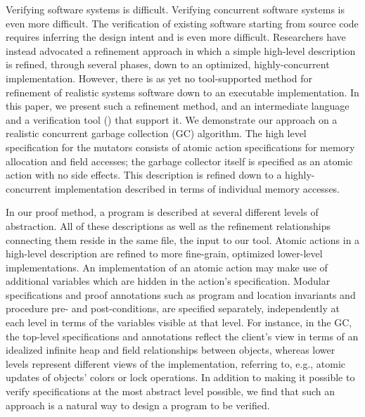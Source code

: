 Verifying software systems is difficult.
Verifying concurrent software systems is even more difficult.
The verification of existing software starting from source code requires inferring the design intent and is even more difficult. 
Researchers have instead advocated a refinement approach in which a simple high-level description is refined, 
through several phases, down to an optimized, highly-concurrent implementation.
However, there is as yet no tool-supported method for refinement of realistic systems software down to an executable implementation.
In this paper, we present such a refinement method, and an intermediate language  and a verification tool (\civl) that support it.
We demonstrate our approach on a realistic concurrent garbage collection (GC) algorithm.
The high level specification for the mutators consists of atomic action specifications for memory allocation and field accesses;
the garbage collector itself is specified as an atomic action with no side effects.
This description is refined down to a highly-concurrent implementation described in terms of individual memory accesses.

In our proof method, a program is described at several different levels of abstraction. 
All of these descriptions as well as the refinement relationships connecting them reside in the same \civl file, the input to our tool. 
Atomic actions in a high-level description are refined to more fine-grain, optimized lower-level implementations. 
An implementation of an atomic action may make use of additional variables which are hidden in the action's specification. 
Modular specifications and proof annotations such as program and location invariants and procedure pre- and post-conditions, 
are specified separately, independently at each level in terms of the variables visible at that level. 
For instance, in the GC, the top-level specifications and annotations reflect the client's view 
in terms of an idealized infinite heap and field relationships between objects, 
whereas lower levels represent different views of the implementation, referring to, 
e.g., atomic updates of objects' colors or lock operations.
In addition to making it possible to verify specifications at the most abstract level possible, 
we find that such an approach is a natural way to design a program to be verified.  


